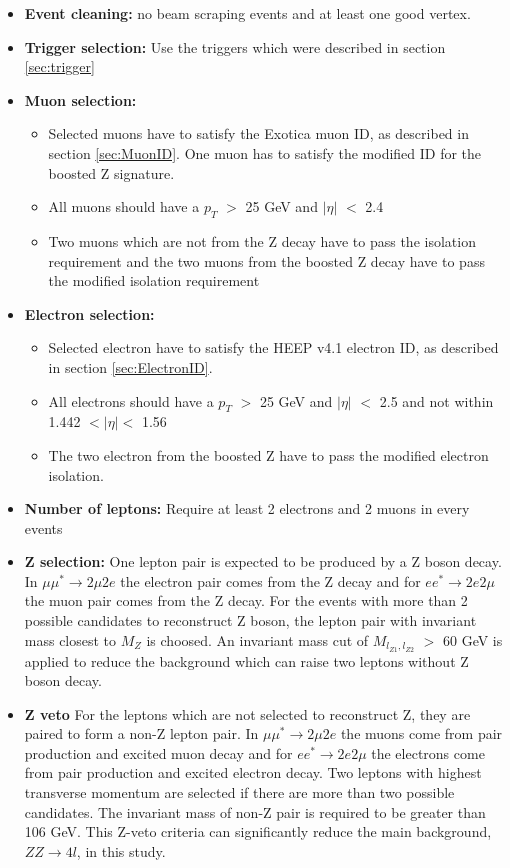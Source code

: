 \begin{itemize}
	\item \textbf{Event cleaning:} no beam scraping events and at least one good vertex.
	\item \textbf{Trigger selection:} Use the triggers which were described in section \ref{sec:trigger}
	\item \textbf{Muon selection:}
	\begin{itemize}
		\item Selected muons have to satisfy the Exotica muon ID, as described in section \ref{sec:MuonID}. One muon has to satisfy the modified ID for the boosted 
Z signature.
		\item All muons should have a $p_{T}$ $>$ 25 GeV and $|\eta|$ $<$ 2.4
		\item Two muons which are not from the Z decay have to pass the isolation requirement and the two muons from the boosted Z decay have to pass the modified 
isolation requirement 
	\end{itemize}
	\item \textbf{Electron selection:}
	\begin{itemize}
		\item Selected electron have to satisfy the HEEP v4.1 electron ID, as described in section \ref{sec:ElectronID}.
		\item All electrons should have a $p_{T}$ $>$ 25 GeV and $|\eta|$ $<$ 2.5 and not within 1.442 $< |\eta| <$ 1.56
		\item The two electron from the boosted Z have to pass the modified electron isolation.
	\end{itemize}
	\item \textbf{Number of leptons:} Require at least 2 electrons and 2 muons in every events 
	\item \textbf{Z selection:} One lepton pair is expected to be produced by a Z boson decay. In $\mu \mu^{*} \rightarrow 2\mu 2e$ the electron pair comes from the Z decay and for $e e^{*} \rightarrow 2e 2\mu$ the muon pair comes from the Z decay. For the events with more than 2 possible candidates to reconstruct Z boson, the lepton pair with invariant mass closest to $M_{Z}$ is choosed. An invariant mass cut of $M_{l_{Z1}, l_{Z2}}$ $>$ 60 GeV is applied to reduce the background which can raise two leptons without Z boson decay.
	\item \textbf{Z veto} For the leptons which are not selected to reconstruct Z, they are paired to form a non-Z lepton pair. In $\mu \mu^{*} \rightarrow 2\mu 2e$ the muons come from pair production and excited muon decay and for $e e^{*} \rightarrow 2e 2\mu$ the electrons  come from pair production and excited electron decay. Two leptons with highest transverse momentum are selected if there are more than two possible candidates. The invariant mass of non-Z pair is required to be greater than 106 GeV. This Z-veto criteria can significantly reduce the main background, $ZZ\rightarrow 4l$, in this study.

\end{itemize}
